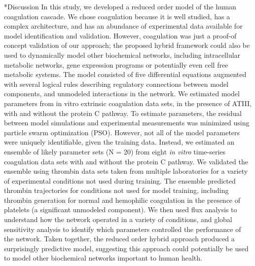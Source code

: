 \documentclass[12pt]{article}
\makeatletter
\renewcommand\section{\@startsection
	{subsection}{2}{0mm}
	{-0.2in}
	{0.05\baselineskip}
	{\normalfont\large\bfseries}}
\makeatother
\begin{document}
\section*{Discussion}
In this study, we developed a reduced order model of the human coagulation cascade.
We chose coagulation because it is well studied, has a complex architecture, 
and has an abundance of experimental data available for model identification and validation. 
However, coagulation was just a proof-of concept validation of our approach; 
the proposed hybrid framework could also be used to dynamically model other biochemical networks, including intracellular metabolic networks, gene expression programs 
or potentially even cell free metabolic systems. 
The model consisted of five differential equations augmented with several logical rules describing 
regulatory connections between model components, and unmodeled interactions in the network. 
We estimated model parameters from in vitro extrinsic coagulation data sets, in the presence of ATIII, with and without the protein C pathway. 
To estimate parameters, the residual between model simulations and experimental measurements was minimized using particle swarm optimization (PSO). 
However, not all of the model parameters were uniquely identifiable, given the training data.
Instead, we estimated an ensemble of likely parameter sets (N = 20)
from eight \emph{in vitro} time-series coagulation data sets with and without the protein C pathway.
We validated the ensemble using thrombin data sets taken from multiple laboratories for a variety of experimental conditions not used during training. 
The ensemble predicted thrombin trajectories for conditions not used for model training, including thrombin generation for normal and hemophilic coagulation 
in the presence of platelets (a significant unmodeled component).
We then used flux analysis to understand how the network operated in a variety of conditions, and global sensitivity analysis to identify which parameters controlled the 
performance of the network. Taken together, the reduced order hybrid approach produced a surprisingly predictive model, suggesting this approach could potentially 
be used to model other biochemical networks important to human health. 
\end{document}
